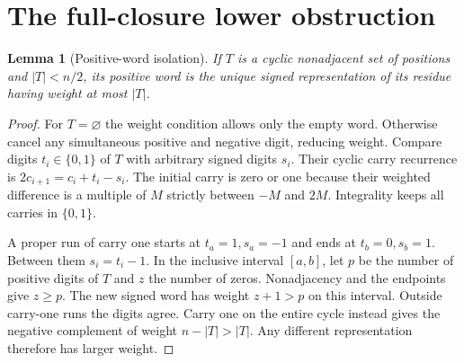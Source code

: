 \documentclass[11pt]{article}
\newtheorem{lemma}[theorem]{Lemma}
\theoremstyle{remark}\newtheorem{remark}[theorem]{Remark}
\begin{document}
\section{The full-closure lower obstruction}
\begin{lemma}[Positive-word isolation]\label{lem:positive}
If $T$ is a cyclic nonadjacent set of positions and $|T|<n/2$, its positive
word is the unique signed representation of its residue having weight
at most $|T|$.
\end{lemma}
\begin{proof}
For $T=\varnothing$ the weight condition allows only the empty word.
Otherwise cancel any simultaneous positive and negative digit, reducing weight.
Compare digits $t_i\in\{0,1\}$ of $T$ with arbitrary signed digits $s_i$.
Their cyclic carry recurrence is
$2c_{i+1}=c_i+t_i-s_i$. The initial carry is zero or one because their
weighted difference is a multiple of $M$ strictly between $-M$ and $2M$.
Integrality keeps all carries in $\{0,1\}$.

A proper run of carry one starts at $t_a=1,s_a=-1$ and ends at
$t_b=0,s_b=1$. Between them $s_i=t_i-1$. In the inclusive interval
$[a,b]$, let $p$ be the number of positive digits of $T$ and $z$ the
number of zeros. Nonadjacency and the endpoints give $z\ge p$. The new
signed word has weight $z+1>p$ on this interval. Outside carry-one runs
the digits agree. Carry one on the entire cycle instead gives the negative
complement of weight $n-|T|>|T|$. Any different representation therefore
has larger weight.
\end{proof}
\end{document}
